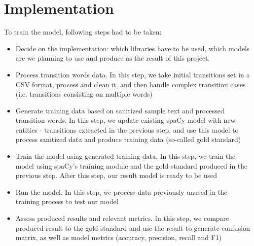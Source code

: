 \section{Implementation}
To train the model, following steps had to be taken:
\begin{itemize}
    \item Decide on the implementation: which libraries have to be used, which models are we planning to use and produce as the result of this project.
    \item Process transition words data. In this step, we take initial transitions set in a CSV format, process and clean it, and then handle complex transition cases (i.e. transitions consisting on multiple words)
    \item Generate training data based on sanitized sample text and processed transition words. In this step, we update existing spaCy model with new entities - transitions extracted in the previous step, and use this model to process sanitized data and produce training data (so-called gold standard)
    \item Train the model using generated training data. In this step, we train the model using spaCy’s training module and the gold standard produced in the previous step. After this step, our result model is ready to be used
    \item Run the model. In this step, we process data previously unused in the training process to test our model
    \item Assess produced results and relevant metrics. In this step, we compare produced result to the gold standard and use the result to generate confusion matrix, as well as model metrics (accuracy, precision, recall and F1)
\end{itemize}

